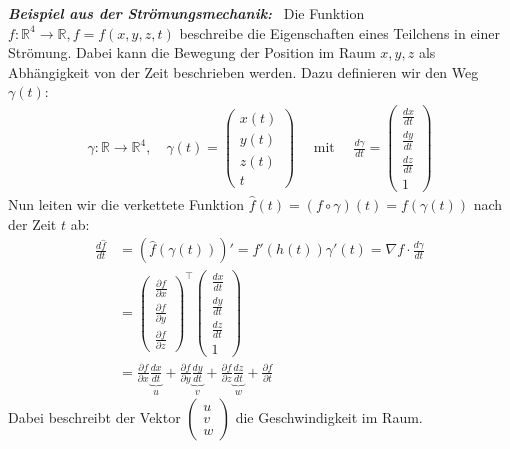 \documentclass[11pt,a4paper]{book}
\newcommand {\R}	{\mathbb{R}}
\newcommand{\1}    	{\mathbbm{1}}
\newcommand{\mitt}	{\textrm{ mit }}
\newcommand{\Beispiel}[1][Anwendungsbeispiel]
{\begin{mdframed}[backgroundcolor=green!7,linewidth=0pt]\noindent\textit{\textbf{{#1}:}}~}
\newcommand{\Beispielende}	{\end{mdframed}}
\begin{document}
\Beispiel[Beispiel aus der Strömungsmechanik]
Die Funktion \(f: \R^4 \rightarrow \R, f = f(x,y,z,t) \) beschreibe die Eigenschaften eines Teilchens in einer Strömung. Dabei kann die Bewegung der Position im Raum \(x,y,z\) als Abhängigkeit von der Zeit beschrieben werden. Dazu definieren wir den Weg \(\gamma(t)\):
\begin{align*}
	\gamma: \R \rightarrow \R^4, \quad
	\gamma(t) = \left( \begin{array}{c}
		x(t) \\
		y(t) \\
		z(t) \\
		t
	\end{array} \right) \quad\mitt\quad
	\frac{d \gamma}{dt} = \left( \begin{array}{c}
		\frac{d x}{dt} \\
		\frac{d y}{dt} \\
		\frac{d z}{dt} \\
		1
	\end{array} \right)
\end{align*}
Nun leiten wir die verkettete Funktion \(\hat{f}(t) = (f \circ \gamma)(t) = f(\gamma(t))\) nach der Zeit \(t\) ab:
\begin{align*}
	\frac{d\hat{f}}{dt} &= \left( \hat{f}(\gamma(t)) \right)' = f'(h(t)) \gamma'(t) = \nabla f \cdot \frac{d\gamma}{dt} \\
	&= \left( \begin{array}{c}
		\frac{\partial f}{\partial x} \\
		\frac{\partial f}{\partial y} \\
		\frac{\partial f}{\partial z}
	\end{array} \right)^\top 
	\left( \begin{array}{c}
		\frac{d x}{dt} \\
		\frac{d y}{dt} \\
		\frac{d z}{dt} \\
		1
	\end{array} \right) \\
	&= \frac{\partial f}{\partial x} \underbrace{\frac{dx}{dt}}_{u}
	+ \frac{\partial f}{\partial y} \underbrace{\frac{dy}{dt}}_{v}
	+ \frac{\partial f}{\partial z} \underbrace{\frac{dz}{dt}}_{w}
	+ \frac{\partial f}{\partial t}
\end{align*}
Dabei beschreibt der Vektor \(\left(\begin{array}{c} u \\ v \\ w \end{array}\right) \) die Geschwindigkeit im Raum.
\Beispielende
\end{document}
